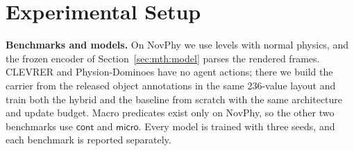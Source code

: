 \section{Experimental Setup}
\label{sec:mth:protocol}

\textbf{Benchmarks and models.} On NovPhy \citep{pinto2024novphy} we use levels with normal physics, and the frozen encoder of Section~\ref{sec:mth:model} parses the rendered frames. CLEVRER \citep{yi2020clevrer} and Physion-Dominoes \citep{bear2021physion} have no agent actions; there we build the carrier from the released object annotations in the same 236-value layout and train both the hybrid and the baseline from scratch with the same architecture and update budget. Macro predicates exist only on NovPhy, so the other two benchmarks use $\textsf{cont}$ and $\textsf{micro}$. Every model is trained with three seeds, and each benchmark is reported separately.


